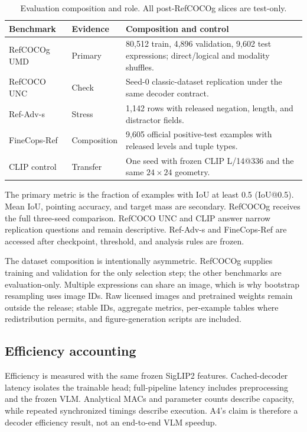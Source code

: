 \documentclass[conference]{IEEEtran}
\begin{document}
\begin{table}[t]
\centering
\caption{Evaluation composition and role. All post-RefCOCOg slices are test-only.}
\label{tab:benchmarks}
\scriptsize
\setlength{\tabcolsep}{2.5pt}
\begin{tabular}{@{}p{}p{}p{}@{}}
\toprule
Benchmark & Evidence & Composition and control \\
\midrule
RefCOCOg UMD & Primary & 80,512 train, 4,896 validation, 9,602 test expressions; direct/logical and modality shuffles. \\
RefCOCO UNC & Check & Seed-0 classic-dataset replication under the same decoder contract. \\
Ref-Adv-s & Stress & 1,142 rows with released negation, length, and distractor fields. \\
FineCops-Ref & Composition & 9,605 official positive-test examples with released levels and tuple types. \\
CLIP control & Transfer & One seed with frozen CLIP L/14@336 and the same $24\times24$ geometry. \\
\bottomrule
\end{tabular}
\end{table}

The primary metric is the fraction of examples with IoU at least 0.5 (IoU@0.5). Mean IoU, pointing accuracy, and target mass are secondary. RefCOCOg receives the full three-seed comparison. RefCOCO UNC and CLIP answer narrow replication questions and remain descriptive. Ref-Adv-s and FineCops-Ref are accessed after checkpoint, threshold, and analysis rules are frozen.

The dataset composition is intentionally asymmetric. RefCOCOg supplies training and validation for the only selection step; the other benchmarks are evaluation-only. Multiple expressions can share an image, which is why bootstrap resampling uses image IDs. Raw licensed images and pretrained weights remain outside the release; stable IDs, aggregate metrics, per-example tables where redistribution permits, and figure-generation scripts are included.

\subsection{Efficiency accounting}
Efficiency is measured with the same frozen SigLIP2 features. Cached-decoder latency isolates the trainable head; full-pipeline latency includes preprocessing and the frozen VLM. Analytical MACs and parameter counts describe capacity, while repeated synchronized timings describe execution. A4's claim is therefore a decoder efficiency result, not an end-to-end VLM speedup.
\end{document}
